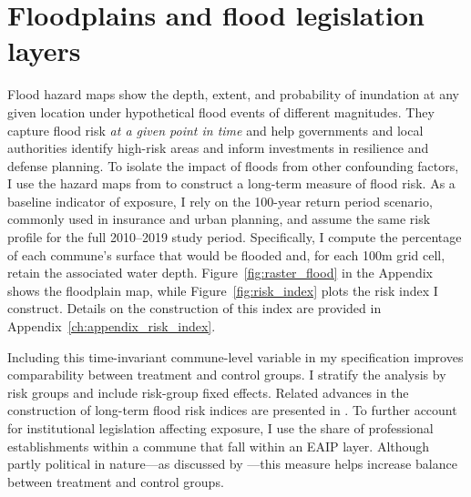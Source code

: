 \section{Floodplains and flood legislation layers}
\label{sec: data_2}

Flood hazard maps show the depth, extent, and probability of inundation at any given location under hypothetical flood events of different magnitudes. They capture flood risk \textit{at a given point in time} and help governments and local authorities identify high-risk areas and inform investments in resilience and defense planning. To isolate the impact of floods from other confounding factors, I use the hazard maps from \citet{dottori_et_al_2022} to construct a long-term measure of flood risk. As a baseline indicator of exposure, I rely on the 100-year return period scenario, commonly used in insurance and urban planning, and assume the same risk profile for the full 2010–2019 study period. Specifically, I compute the percentage of each commune’s surface that would be flooded and, for each 100m grid cell, retain the associated water depth. Figure~\ref{fig:raster_flood} in the Appendix shows the floodplain map, while Figure~\ref{fig:risk_index} plots the risk index I construct. Details on the construction of this index are provided in Appendix~\ref{ch:appendix_risk_index}.

Including this time-invariant commune-level variable in my specification improves comparability between treatment and control groups. I stratify the analysis by risk groups and include risk-group fixed effects. Related advances in the construction of long-term flood risk indices are presented in \citet{hussain2024flooding}. To further account for institutional legislation affecting exposure, I use the share of professional establishments within a commune that fall within an EAIP layer. Although partly political in nature—as discussed by \citet{CHELLE20251}—this measure helps increase balance between treatment and control groups.









